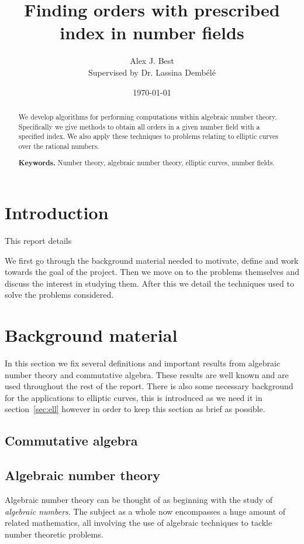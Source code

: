 \documentclass[11pt,a4paper]{report}
\author{Alex J. Best \\Supervised by Dr. Lassina Demb\'el\'e}
\date{\today}
\title{Finding orders with prescribed index in number fields}
\theoremstyle{definition}
\begin{document}
\maketitle
\tableofcontents

\begin{abstract}
We develop algorithms for performing computations within algebraic number theory.
Specifically we give methods to obtain all orders in a given number field with a specified index.
We also apply these techniques to problems relating to elliptic curves over the rational numbers.

\smallskip
\noindent \textbf{Keywords.} Number theory, algebraic number theory, elliptic curves, number fields.
\end{abstract}

\chapter{Introduction}
This report details 

We first go through the background material needed to motivate, define and work towards the goal of the project.
Then we move on to the problems themselves and discuss the interest in studying them.
After this we detail the techniques used to solve the problems considered.

\chapter{Background material}

In this section we fix several definitions and important results from algebraic number theory and commutative algebra.
These results are well known and are used throughout the rest of the report.
There is also some necessary background for the applications to elliptic curves, this is introduced as we need it in section~\ref{sec:ell} however in order to keep this section as brief as possible.

\section{Commutative algebra}


\section{Algebraic number theory}

Algebraic number theory can be thought of as beginning with the study of \emph{algebraic numbers}.
The subject as a whole now encompasses a huge amount of related mathematics, all involving the use of algebraic techniques to tackle number theoretic problems. %
\end{document}
